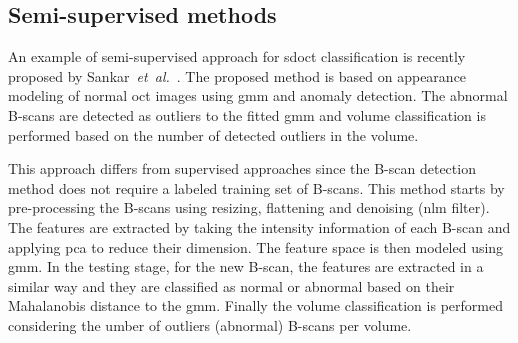 \subsection{Semi-supervised methods}
An example of semi-supervised approach for \gls{sdoct} classification is recently proposed by Sankar~\textit{et~al.}~\cite{sankar2016classification}.
The proposed method is based on appearance modeling of normal \gls{oct} images using \gls{gmm} and anomaly detection.
The abnormal B-scans are detected as outliers to the fitted \gls{gmm} and volume classification is performed based on the number of detected outliers in the volume.

This approach differs from supervised approaches since the B-scan detection method does not require a labeled training set of B-scans.
This method starts by pre-processing the B-scans using resizing, flattening and denoising (\gls{nlm} filter).
The features are extracted by taking the intensity information of each B-scan and applying \gls{pca} to reduce their dimension.
The feature space is then modeled using \gls{gmm}.
In the testing stage, for the new B-scan, the features are extracted in a similar way and they are classified as normal or abnormal based on their Mahalanobis distance to the \gls{gmm}.
Finally the volume classification is performed considering the umber of outliers (abnormal) B-scans per volume.

% 
